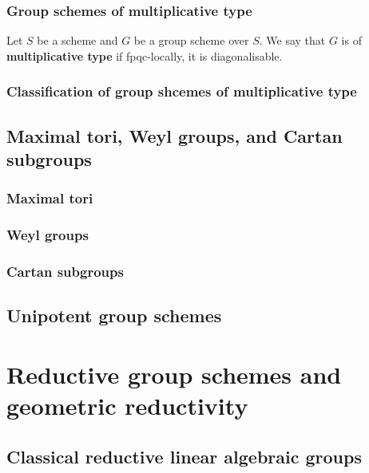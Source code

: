         \subsubsection{Group schemes of multiplicative type}
            \begin{definition} \label{def: group_schemes_of_multiplicative_type}
                Let $S$ be a scheme and $G$ be a group scheme over $S$. We say that $G$ is of \textbf{multiplicative type} if fpqc-locally, it is diagonalisable.     
            \end{definition}
            
        \subsubsection{Classification of group shcemes of multiplicative type}
        
    \subsection{Maximal tori, Weyl groups, and Cartan subgroups}
        \subsubsection{Maximal tori}
        
        \subsubsection{Weyl groups}
        
        \subsubsection{Cartan subgroups}
                
    \subsection{Unipotent group schemes}
    
\section{Reductive group schemes and geometric reductivity}
    \subsection{Classical reductive linear algebraic groups}
    
